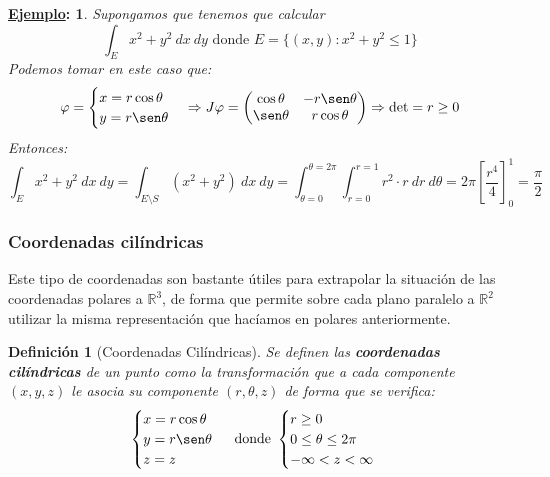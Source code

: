\documentclass[10pt,a4paper,openright]{book}
\theoremstyle{break}
\newtheorem*{defi}{Definición}
\newtheorem*{ej}{\underline{Ejemplo}:}
\newcommand{\dif}[1]{\ d#1}
\begin{document}
\begin{ej}
Supongamos que tenemos que calcular
$$\int_E x^2 + y^2 \dif{x}\dif{y} \mbox{ donde } E = \{\left(x, y\right): x^2 + y^2 \le 1\}$$
Podemos tomar en este caso que:
$$\varphi = \begin{cases} x = r\cos \theta \\ y = r\sen\theta \end{cases} \Rightarrow J\varphi = \begin{pmatrix} \cos \theta & -r\sen \theta \\ \sen \theta & r\cos \theta \end{pmatrix} \Rightarrow \det = r \ge 0$$
Entonces:
$$\int_E x^2 + y^2 \dif{x} \dif{y} = \int_{E\setminus S} \left(x^2 + y^2\right) \dif{x} \dif{y} = \int_{\theta = 0}^{\theta = 2\pi} \int_{r = 0}^{r = 1} r^2 \cdot r \dif{r} \dif{\theta} = 2\pi \left[\frac{r^4}{4}\right]_0^1 = \frac{\pi}{2} $$
\end{ej}

\subsubsection*{Coordenadas cilíndricas}
Este tipo de coordenadas son bastante útiles para extrapolar la situación de las coordenadas polares a $\mathbb{R}^3$, de forma que permite sobre cada plano paralelo a $\mathbb{R}^2$ utilizar la misma representación que hacíamos en polares anteriormente.

\begin{defi}[Coordenadas Cilíndricas]
Se definen las \textbf{coordenadas cilíndricas} de un punto como la transformación que a cada componente $(x,y,z)$ le asocia su componente $(r, \theta, z)$ de forma que se verifica:
$$\begin{cases} x = r \cos \theta \\ y = r \sen \theta \\ z = z\end{cases} \mbox{ donde } \begin{cases} r \ge 0\\ 0 \le \theta \le 2\pi \\ -\infty < z < \infty \end{cases}$$
\end{defi}
\end{document}
